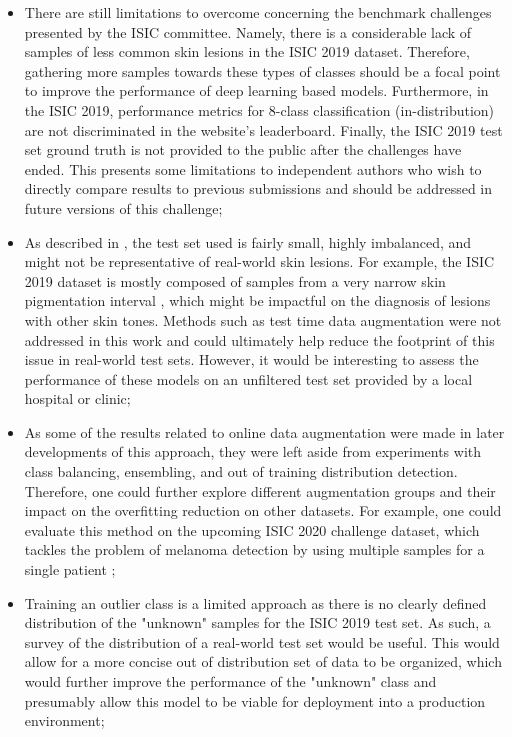     \begin{itemize}
        \item There are still limitations to overcome concerning the benchmark challenges presented by the \ac{ISIC} committee. Namely, there is a considerable lack of samples of less common skin lesions in the \ac{ISIC} 2019 dataset. Therefore, gathering more samples towards these types of classes should be a focal point to improve the performance of deep learning based models. Furthermore, in the \ac{ISIC} 2019, performance metrics for 8-class classification (in-distribution) are not discriminated in the website's leaderboard. Finally, the \ac{ISIC} 2019 test set ground truth is not provided to the public after the challenges have ended. This presents some limitations to independent authors who wish to directly compare results to previous submissions and should be addressed in future versions of this challenge;
    
        \item As described in , the test set used is fairly small, highly imbalanced, and might not be representative of real-world skin lesions. For example, the \ac{ISIC} 2019 dataset is mostly composed of samples from a very narrow skin pigmentation interval \cite{isic2019}, which might be impactful on the diagnosis of lesions with other skin tones. Methods such as test time data augmentation were not addressed in this work and could ultimately help reduce the footprint of this issue in real-world test sets. However, it would be interesting to assess the performance of these models on an unfiltered test set provided by a local hospital or clinic;
        
        \item As some of the results related to online data augmentation were made in later developments of this approach, they were left aside from experiments with class balancing, ensembling, and out of training distribution detection. Therefore, one could further explore different augmentation groups and their impact on the overfitting reduction on other datasets. For example, one could evaluate this method on the upcoming \ac{ISIC} 2020 challenge dataset, which tackles the problem of melanoma detection by using multiple samples for a single patient \cite{isic2020};
        
        \item Training an outlier class is a limited approach as there is no clearly defined distribution of the "unknown" samples for the \ac{ISIC} 2019 test set. As such, a survey of the distribution of a real-world test set would be useful. This would allow for a more concise out of distribution set of data to be organized, which would further improve the performance of the "unknown" class and presumably allow this model to be viable for deployment into a production environment; 
        

\end{itemize}
